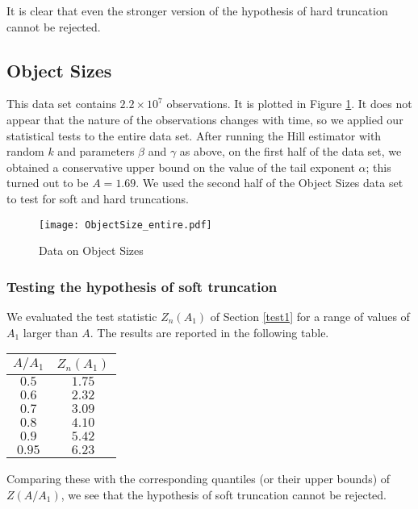 \documentclass[11pt]{amsart}
\numberwithin{equation}{section}
\begin{document}
It is clear that even the stronger version of the  hypothesis of hard
truncation cannot be rejected.

\subsection{Object Sizes} This data set contains $2.2\times10^7$
observations. It is plotted in Figure
\ref{data:ObjectSize}. It does not appear that the nature of the
observations changes with time, so we applied our statistical tests to
the entire data set. After running the Hill estimator with random $k$
and parameters $\beta$ and $\gamma$ as above, on the first half of the
data set, we obtained a conservative upper bound on the value of the
tail exponent $\alpha$; this turned out to be $A=1.69$. We used the
second half of the Object Sizes data set to test for soft and hard
truncations.
\begin{figure}
\begin{center}
\texttt{[image: ObjectSize\_entire.pdf]}
\caption{Data on Object Sizes}\label{data:ObjectSize}
\end{center}
\end{figure}

\subsubsection*{Testing the hypothesis of soft truncation} We
evaluated the test statistic $Z_n(A_1)$ of Section
\ref{test1}  for a range of values of $A_1$ larger than $A$. The
results are reported in the following table.
\begin{center}
\begin{tabular}{c|c}
$A/A_1$&$Z_n(A_1)$\\
\hline
$0.5$&$1.75$\\
$0.6$&$2.32$\\
$0.7$&$3.09$\\
$0.8$&$4.10$\\
$0.9$&$5.42$\\
$0.95$&$6.23$
\end{tabular}
\end{center}
Comparing these with the corresponding quantiles (or their upper
bounds) of $Z(A/A_1)$, we see that the hypothesis of soft truncation
cannot be rejected.
\end{document}
